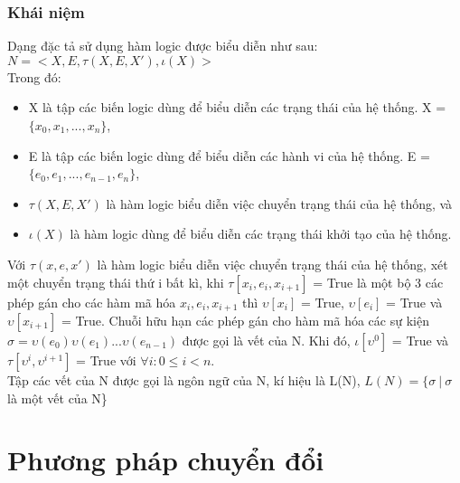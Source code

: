 \documentclass{article}
\begin{document}
\begin{flushleft}
			\subsubsection{Khái niệm}
			Dạng đặc tả sử dụng hàm logic được biểu diễn như sau: \\
				$N = <X, E, \tau(X, E, X'), \iota(X)>$\\
				Trong đó:\\
				\begin{itemize}
					\item X là tập các biến logic dùng để biểu diễn các trạng thái của hệ thống. X = $\{x_0, x_1, ..., x_n\}$,
					\item E là tập các biến logic dùng để biểu diễn các hành vi của hệ thống. E = $\{e_0, e_1, ..., e_{n-1}, e_n\}$,
					\item $\tau(X, E, X')$ là hàm logic biểu diễn việc chuyển trạng thái của hệ thống, và
					\item $\iota(X)$ là hàm logic dùng để biểu diễn các trạng thái khởi tạo của hệ thống.
				\end{itemize}
				Với $\tau(x, e, x')$ là hàm logic biểu diễn việc chuyển trạng thái của hệ thống, xét một chuyển trạng thái thứ i bất kì, khi $\tau[x_i, e_i, x_{i+1}]$ = True là một bộ 3 các phép gán cho các hàm mã hóa $x_i, e_i, x_{i+1}$ thì $\upsilon[x_i]$ = True, $\upsilon[e_i]$ = True và $\upsilon[x_{i+1}]$ = True. Chuỗi hữu hạn các phép gán cho hàm mã hóa các sự kiện $\sigma = \upsilon(e_0)\upsilon(e_1)...\upsilon(e_{n-1})$ được gọi là vết của N. Khi đó, $\iota[\upsilon^0]$ = True và $\tau[\upsilon^i, \upsilon^{i+1}]$ = True với $\forall i: 0 \leq i < n$.\\
				Tập các vết của N được gọi là ngôn ngữ của N, kí hiệu là L(N), $L(N) = \{\sigma\ |\ \sigma$ là một vết của N\}\\
		\section{Phương pháp chuyển đổi}

\end{flushleft}
\end{document}
